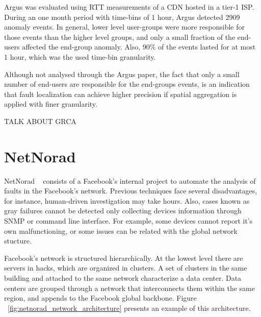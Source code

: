 Argus was evaluated using RTT measurements of a CDN hosted in a tier-1 ISP.
During an
one month period with time-bins of 1 hour, Argus detected 2909
anomaly events. In general, lower level user-groups were more responsible
for those events than the higher level groups,
and only a small fraction of the end-users affected the end-group anomaly.
Also, 90\% of the events lasted for
at most 1 hour, which was the used time-bin granularity.

Although not analysed through the Argus paper, the fact that only a small number
of end-users are responsible for the end-groups events, is an indication that
fault localization can achieve higher precision if spatial aggregation is
applied with finer granularity.

TALK ABOUT GRCA

\section{NetNorad}

NetNorad ~\cite{netnorad} consists of a Facebook's internal project to
automate the analysis of faults in the Facebook's
network. Previous techniques face several disadvantages, for instance,
human-driven investigation may take hours. Also, cases known as gray failures
cannot be detected only collecting devices information through SNMP or command
line
interface. For example, some devices cannot report it's own malfunctioning, or
some issues can be related with the global network stucture.

Facebook's network is structured hierarchically. At the
lowest level there are servers in hacks, which are organized in
clusters. A set of clusters in the same building and attached to
the same network characterize a data center. Data centers are grouped
through a network that interconnects them within the same region, and appends
to the Facebook global backbone. Figure
~\ref{fig:netnorad_network_architecture} presents an example of this
architecture.

